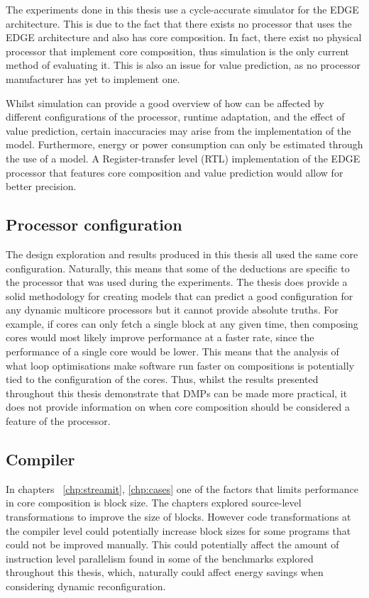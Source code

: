 The experiments done in this thesis use a cycle-accurate simulator for the EDGE architecture.
This is due to the fact that there exists no processor that uses the EDGE architecture and also has core composition.
In fact, there exist no physical processor that implement core composition, thus simulation is the only current method of evaluating it.
This is also an issue for value prediction, as no processor manufacturer has yet to implement one.

Whilst simulation can provide a good overview of how can be affected by different configurations of the processor, runtime adaptation, and the effect of value prediction, certain inaccuracies may arise from the implementation of the model.
Furthermore, energy or power consumption can only be estimated through the use of a model.
A Register-transfer level (RTL) implementation of the EDGE processor that features core composition and value prediction would allow for better precision.

\subsection{Processor configuration}
The design exploration and results produced in this thesis all used the same core configuration.
Naturally, this means that some of the deductions are specific to the processor that was used during the experiments.
The thesis does provide a solid methodology for creating models that can predict a good configuration for any dynamic multicore processors but it cannot provide absolute truths.
For example, if cores can only fetch a single block at any given time, then composing cores would most likely improve performance at a faster rate, since the performance of a single core would be lower.
This means that the analysis of what loop optimisations make software run faster on compositions is potentially tied to the configuration of the cores.
Thus, whilst the results presented throughout this thesis demonstrate that DMPs can be made more practical, it does not provide information on when core composition should be considered a feature of the processor.

\subsection{Compiler}
In chapters ~\ref{chp:streamit}, \ref{chp:cases} one of the factors that limits performance in core composition is block size.
The chapters explored source-level transformations to improve the size of blocks.
However code transformations at the compiler level could potentially increase block sizes for some programs that could not be improved manually.
This could potentially affect the amount of instruction level parallelism found in some of the benchmarks explored throughout this thesis, which, naturally could affect energy savings when considering dynamic reconfiguration.

